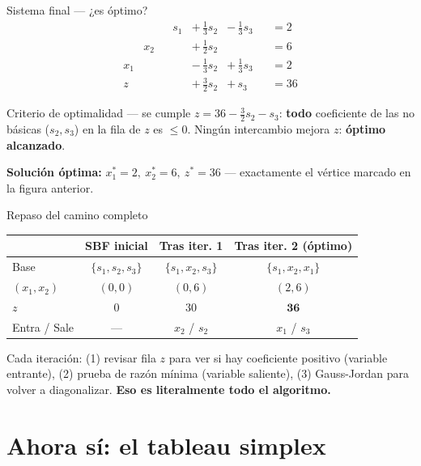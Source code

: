 \documentclass[aspectratio=169]{beamer}
\begin{document}
\begin{frame}{Sistema final --- ¿es óptimo?}
\[
\begin{aligned}
&&&s_1 &+\,\tfrac13 s_2 &-\,\tfrac13 s_3 &&= 2\\
&x_2 & & &+\,\tfrac12 s_2 & &&= 6\\
x_1& & & &-\,\tfrac13 s_2 &+\,\tfrac13 s_3&&= 2\\
\hline
z& & & &+\,\tfrac32 s_2 &+\,s_3 && = 36
\end{aligned}
\]
\par\medskip
\begin{alertblock}{Criterio de optimalidad --- se cumple}
$z = 36 - \tfrac32 s_2 - s_3$: \textbf{todo} coeficiente de las no básicas ($s_2,s_3$) en la fila de $z$ es $\leq 0$. Ningún intercambio mejora $z$: \textbf{óptimo alcanzado}.
\end{alertblock}

\textbf{Solución óptima:} $x_1^\ast=2,\ x_2^\ast=6,\ z^\ast=36$ --- exactamente el vértice marcado en la figura anterior.
\end{frame}

\begin{frame}{Repaso del camino completo}
\begin{center}
\begin{tabular}{@{}lccc@{}}
\toprule
& \textbf{SBF inicial} & \textbf{Tras iter. 1} & \textbf{Tras iter. 2 (óptimo)}\\
\midrule
Base & $\{s_1,s_2,s_3\}$ & $\{s_1,x_2,s_3\}$ & $\{s_1,x_2,x_1\}$\\
$(x_1,x_2)$ & $(0,0)$ & $(0,6)$ & $(2,6)$\\
$z$ & $0$ & $30$ & $\mathbf{36}$\\
Entra / Sale & --- & $x_2$ / $s_2$ & $x_1$ / $s_3$\\
\bottomrule
\end{tabular}
\end{center}

\vspace{0.3cm}
Cada iteración: (1) revisar fila $z$ para ver si hay coeficiente positivo (variable entrante), (2) prueba de razón mínima (variable saliente), (3) Gauss-Jordan para volver a diagonalizar. \textbf{Eso es literalmente todo el algoritmo.}
\end{frame}

\section{Ahora sí: el tableau simplex}
\end{document}

